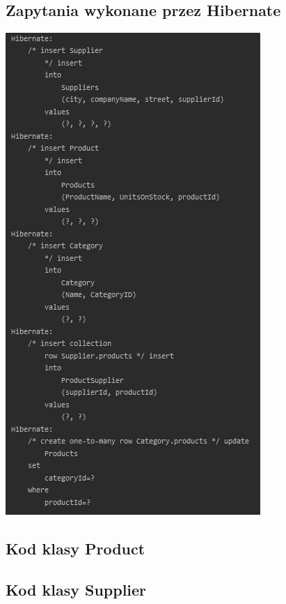 \documentclass[a4paper, 11pt]{article}
\begin{document}
    \subsection{Zapytania wykonane przez Hibernate}
    \begin{center}
        \includegraphics[scale=1.3]{images/point6/hibernateQueries.png}
    \end{center}

    \newpage

    \subsection{Kod klasy Product}
    

    \newpage

    \subsection{Kod klasy Supplier}
    
\end{document}
